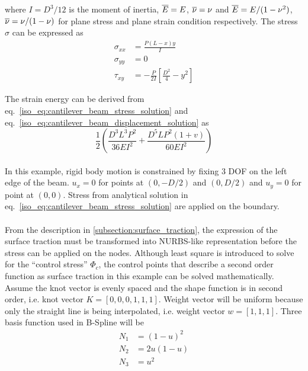 where $I=D^3/12$ is the moment of inertia, $\overline{E}=E$, $\overline{\nu}=\nu$ and $\overline{E}=E/(1-\nu^2)$, $\overline{\nu}=\nu/(1-\nu)$ for plane stress and plane strain condition respectively.
The stress $\sigma$ can be expressed as \cite{Aug2008}
    \begin{subequations}
    \begin{align}
        \sigma_{xx} &= \frac{P(L-x)y}{I} \\
        \sigma_{yy} &= 0 \\
        \tau_{xy} &= -\frac{P}{2I} \left[
            \frac{D^2}{4} - y^2
        \right]
    \end{align}
    \label{iso_eq:cantilever_beam_stress_solution}
    \end{subequations}

The strain energy can be derived from eq.~\ref{iso_eq:cantilever_beam_stress_solution} and eq.~\ref{iso_eq:cantilever_beam_displacement_solution} as
    \begin{equation}
        \frac{1}{2} \left(
            \frac{D^3 L^3 P^2}{36EI^2} + 
            \frac{D^5LP^2(1+v)}{60EI^2}
        \right)
    \label{iso_eq:cantilever_beam_energy_solution}
    \end{equation}

\paragraph{}
In this example, rigid body motion is constrained by fixing 3 DOF on the left edge of the beam.
$u_x=0$ for points at $(0,-D/2)$ and $(0,D/2)$ and $u_y =0$ for point at $(0,0)$.
Stress from analytical solution in eq.~\ref{iso_eq:cantilever_beam_stress_solution} are applied on the boundary.

\paragraph{}
From the description in \ref{subsection:surface_traction}, the expression of the surface traction must be transformed into NURBS-like representation before the stress can be applied on the nodes.
Although least square is introduced to solve for the ``control stress'' $\Phi_c$, the control points that describe a second order function as surface traction in this example can be solved mathematically.
Assume the knot vector is evenly spaced and the shape function is in second order, i.e. knot vector $K=[0,0,0,1,1,1]$.
Weight vector will be uniform because only the straight line is being interpolated, i.e. weight vector $w=[1,1,1]$.
Three basis function used in B-Spline will be
    \begin{equation}
    \begin{aligned}
        N_1 & = (1-u)^2 \\
        N_2 & = 2u(1-u) \\
        N_3 & = u^2
    \end{aligned}
    \end{equation}

